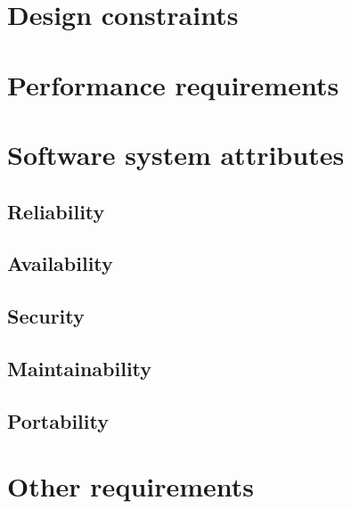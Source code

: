 	\section{Design constraints}
	\section{Performance requirements}
	\section{Software system attributes}
		\subsection{Reliability}
		\subsection{Availability}
		\subsection{Security}
		\subsection{Maintainability}
		\subsection{Portability}
	\section{Other requirements}